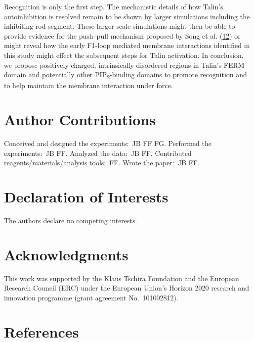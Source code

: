\documentclass[
  twocolumn]{biophys-new-mod}
\begin{document}
Recognition is only the first step. The mechanistic details of how
Talin's autoinhibition is resolved remain to be shown by larger
simulations including the inhibiting rod segment. These larger-scale
simulations might then be able to provide evidence for the push--pull
mechanism proposed by Song et al.
(\protect\hyperlink{ref-songNovelMembranedependentSwitch2012a}{12}) or
might reveal how the early F1-loop mediated membrane interactions
identified in this study might effect the subsequent steps for Talin
activation. In conclusion, we propose positively charged, intrinsically
disordered regions in Talin's FERM domain and potentially other
PIP\textsubscript{2}-binding domains to promote recognition and to help
maintain the membrane interaction under force.

\hypertarget{author-contributions}{%
\section{Author Contributions}\label{author-contributions}}

Conceived and designed the experiments:~JB FF FG. Performed the
experiments:~JB FF. Analyzed the data:~JB FF. Contributed
reagents/materials/analysis tools:~FF. Wrote the paper:~JB FF.

\hypertarget{declaration-of-interests}{%
\section{Declaration of Interests}\label{declaration-of-interests}}

The authors declare no competing interests.

\hypertarget{acknowledgments}{%
\section{Acknowledgments}\label{acknowledgments}}

This work was supported by the Klaus Tschira Foundation and the European
Research Council (ERC) under the European Union's Horizon 2020 research
and innovation programme (grant agreement No.~101002812).

\hypertarget{references}{%
\section{References}\label{references}}
\end{document}

